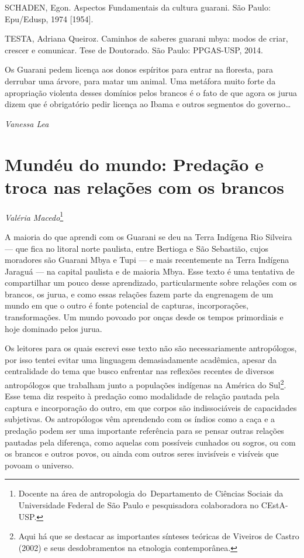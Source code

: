 SCHADEN, Egon. Aspectos Fundamentais da cultura guarani. São Paulo:
Epu/Edusp, 1974 [1954].

TESTA, Adriana Queiroz. Caminhos de saberes guarani mbya: modos de
criar, crescer e comunicar. Tese de Doutorado. São Paulo: PPGAS-USP,
2014.

Os Guarani pedem licença aos donos espíritos para entrar na floresta,
para derrubar uma árvore, para matar um animal. Uma metáfora muito
forte da apropriação violenta desses domínios pelos brancos é o fato de
que agora os jurua dizem que é obrigatório pedir licença ao Ibama e
outros segmentos do governo\ldots{}
\medskip
\begin{flushright}
\emph{Vanessa Lea}
\end{flushright}

\chapter{Mundéu do mundo: Predação e troca nas relações com os brancos} 
\begin{flushright}
\emph{Valéria Macedo}\footnote{Docente na área de antropologia
do~Departamento de Ciências Sociais da Universidade Federal de São
Paulo e pesquisadora colaboradora no CEstA-USP.}
\end{flushright}
\medskip

A maioria do que aprendi com os Guarani se deu na Terra Indígena Rio
Silveira — que fica no litoral norte paulista, entre Bertioga e São
Sebastião, cujos moradores são Guarani Mbya e Tupi — e mais
recentemente na Terra Indígena Jaraguá — na capital paulista e de
maioria Mbya. Esse texto é uma tentativa de compartilhar um pouco desse
aprendizado, particularmente sobre relações com os brancos, os jurua, e
como essas relações fazem parte da engrenagem de um mundo em que o
outro é fonte potencial de capturas, incorporações, transformações. Um
mundo povoado por onças desde os tempos primordiais e hoje dominado
pelos jurua. 

Os leitores para os quais escrevi esse texto não são necessariamente
antropólogos, por isso tentei evitar uma linguagem demasiadamente
acadêmica, apesar da centralidade do tema que busco enfrentar nas
reflexões recentes de diversos antropólogos que trabalham junto a
populações indígenas na América do Sul\footnote{Aqui há que se destacar
as importantes sínteses teóricas de Viveiros de Castro (2002) e seus
desdobramentos na etnologia contemporânea.}. Esse tema diz respeito à
predação como modalidade de relação pautada pela captura e incorporação
do outro, em que corpos são indissociáveis de capacidades subjetivas.
Os antropólogos vêm aprendendo com os índios como a caça e a predação
podem ser uma importante referência para se pensar outras relações
pautadas pela diferença, como aquelas com possíveis cunhados ou sogros,
ou com os brancos e outros povos, ou ainda com outros seres invisíveis
e visíveis que povoam o universo.

